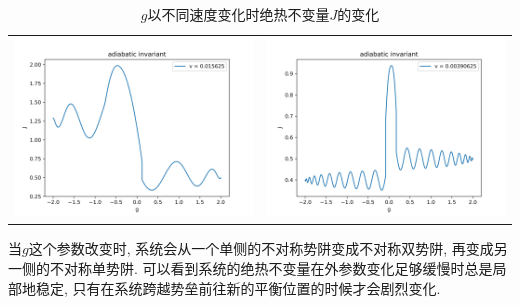 \documentclass[a4paper,zihao=5,UTF8]{ctexart}
\begin{document}
\begin{table}[htbp]
\begin{tabular}[htbp]{cc}
            \includegraphics[scale=0.5]{3_ad_invr_v=0_015625.png} & \includegraphics[scale=0.5]{3_ad_invr_v=0_00390625.png}
        \end{tabular}
        \caption{$g$以不同速度变化时绝热不变量$J$的变化}
        \label{g change J}
    \end{table}
    \par 
    当$g$这个参数改变时, 系统会从一个单侧的不对称势阱变成不对称双势阱, 再变成另一侧的不对称单势阱. 
    可以看到系统的绝热不变量在外参数变化足够缓慢时总是局部地稳定, 只有在系统跨越势垒前往新的平衡位置的时候才会剧烈变化.
\end{document}
